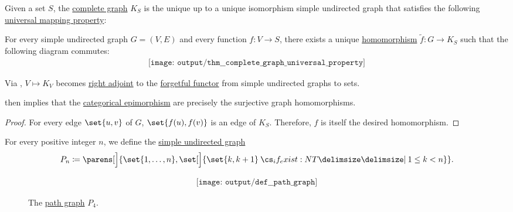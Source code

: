 \begin{theorem}\label{thm:complete_graph_universal_property}
  Given a set \( S \), the \hyperref[def:complete_graph]{complete graph} \( K_S \) is the unique up to a unique isomorphism simple undirected graph that satisfies the following \hyperref[rem:universal_mapping_property]{universal mapping property}:
  \begin{displayquote}
    For every simple undirected graph \( G = (V, E) \) and every function \( f: V \to S \), there exists a unique \hyperref[def:undirected_graph/homomorphism]{homomorphism} \( \widetilde{f}: G \to K_S \) such that the following diagram commutes:
    \begin{equation}\label{eq:thm:edgeless_graph_universal_property/diagram}
      \begin{aligned}
        \texttt{[image: output/thm\_\_complete\_graph\_universal\_property]}
      \end{aligned}
    \end{equation}
  \end{displayquote}
\end{theorem}
\begin{comments}
  \item Via , \( V \mapsto K_V \) becomes \hyperref[def:category_adjunction]{right adjoint} to the \hyperref[def:concrete_category]{forgetful functor} from simple undirected graphs to sets.

   then implies that the \hyperref[def:morphism_invertibility/right_cancellative]{categorical epimorphism} are precisely the surjective graph homomorphisms.
\end{comments}
\begin{proof}
  For every edge \( \set{ u, v } \) of \( G \), \( \set{ f(u), f(v) } \) is an edge of \( K_S \). Therefore, \( f \) is itself the desired homomorphism.
\end{proof}

\begin{definition}\label{def:path_graph}
  For every positive integer \( n \), we define the \hyperref[def:undirected_graph]{simple undirected graph}
  \begin{equation*}
    P_n \coloneqq \parens[\Big]{ \set{ 1, \ldots, n }, \set[\Big]{ \set{ k, k + 1 } \given* 1 \leq k < n } }.
  \end{equation*}

  \begin{figure}[!ht]
    \begin{equation}\label{eq:fig:def:path_graph/p4}
      \begin{aligned}
        \texttt{[image: output/def\_\_path\_graph]}
      \end{aligned}
    \end{equation}
    \caption{The \hyperref[def:path_graph]{path graph} \( P_4 \).}\label{fig:def:path_graph/p4}
  \end{figure}
\end{definition}

